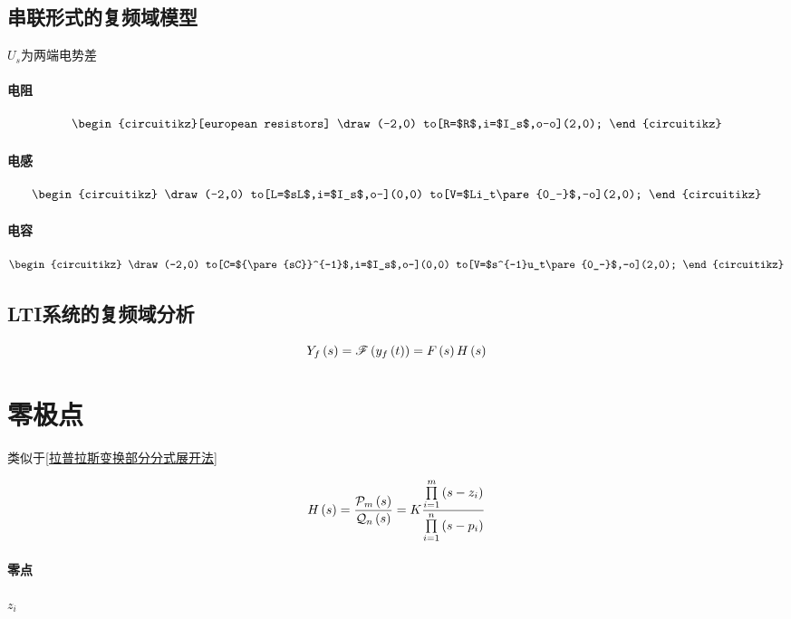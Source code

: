 \documentclass{article}
\begin{document}
\subsection{串联形式的复频域模型}

$U_s$为两端电势差

\paragraph{电阻}

\[\begin{circuitikz}[european resistors]
        \draw(-2,0)
        to[R=$R$,i=$I_s$,o-o](2,0);
    \end{circuitikz}\]

\paragraph{电感}

\[\begin{circuitikz}
        \draw(-2,0)
        to[L=$sL$,i=$I_s$,o-](0,0)
        to[V=$Li_t\pare{0_-}$,-o](2,0);
    \end{circuitikz}\]

\paragraph{电容}

\[\begin{circuitikz}
        \draw(-2,0)
        to[C=${\pare{sC}}^{-1}$,i=$I_s$,o-](0,0)
        to[V=$s^{-1}u_t\pare{0_-}$,-o](2,0);
    \end{circuitikz}\]

\subsection{LTI系统的复频域分析}

\[Y_f\left(s\right)=\mathscr F\left(y_f\left(t\right)\right)=F\left(s\right) H\left(s\right)\]

\section{零极点}

类似于\ref{拉普拉斯变换部分分式展开法}

\[H\left(s\right)=\frac{\mathcal P_m\left(s\right)}{\mathcal Q_n\left(s\right)}
    =K\frac{\prod\limits_{i=1}^m\left(s-z_i\right)}
    {\prod\limits_{i=1}^n\left(s-p_i\right)}\]

\paragraph{零点}$z_i$
\end{document}
